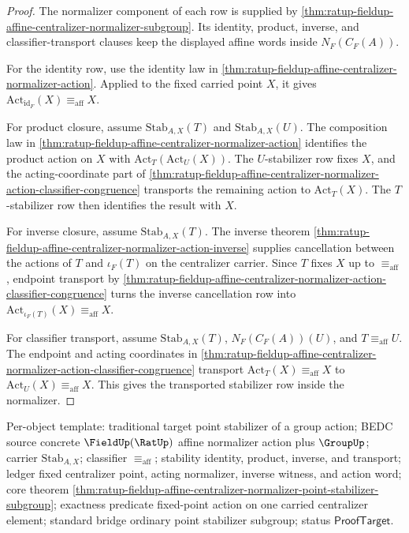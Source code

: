 \begin{proof}
The normalizer component of each row is supplied by
\autoref{thm:ratup-fieldup-affine-centralizer-normalizer-subgroup}. Its
identity, product, inverse, and classifier-transport clauses keep the displayed
affine words inside $N_F(C_F(A))$.

For the identity row, use the identity law in
\autoref{thm:ratup-fieldup-affine-centralizer-normalizer-action}. Applied to
the fixed carried point $X$, it gives
$\mathrm{Act}_{\mathrm{id}_F}(X)\equiv_{\mathrm{aff}}X$.

For product closure, assume $\mathrm{Stab}_{A,X}(T)$ and
$\mathrm{Stab}_{A,X}(U)$. The composition law in
\autoref{thm:ratup-fieldup-affine-centralizer-normalizer-action} identifies
the product action on $X$ with
$\mathrm{Act}_T(\mathrm{Act}_U(X))$. The $U$-stabilizer row fixes $X$, and the
acting-coordinate part of
\autoref{thm:ratup-fieldup-affine-centralizer-normalizer-action-classifier-congruence}
transports the remaining action to $\mathrm{Act}_T(X)$. The $T$-stabilizer row
then identifies the result with $X$.

For inverse closure, assume $\mathrm{Stab}_{A,X}(T)$. The inverse theorem
\autoref{thm:ratup-fieldup-affine-centralizer-normalizer-action-inverse}
supplies cancellation between the actions of $T$ and $\iota_F(T)$ on the
centralizer carrier. Since $T$ fixes $X$ up to $\equiv_{\mathrm{aff}}$, endpoint
transport by
\autoref{thm:ratup-fieldup-affine-centralizer-normalizer-action-classifier-congruence}
turns the inverse cancellation row into
$\mathrm{Act}_{\iota_F(T)}(X)\equiv_{\mathrm{aff}}X$.

For classifier transport, assume $\mathrm{Stab}_{A,X}(T)$,
$N_F(C_F(A))(U)$, and $T\equiv_{\mathrm{aff}}U$. The endpoint and acting
coordinates in
\autoref{thm:ratup-fieldup-affine-centralizer-normalizer-action-classifier-congruence}
transport $\mathrm{Act}_T(X)\equiv_{\mathrm{aff}}X$ to
$\mathrm{Act}_U(X)\equiv_{\mathrm{aff}}X$. This gives the transported
stabilizer row inside the normalizer.
\end{proof}

Per-object template: traditional target point stabilizer of a group action;
BEDC source concrete $\FieldUp(\RatUp)$ affine normalizer action plus
$\GroupUp$; carrier $\mathrm{Stab}_{A,X}$; classifier
$\equiv_{\mathrm{aff}}$; stability identity, product, inverse, and transport;
ledger fixed centralizer point, acting normalizer, inverse witness, and action
word; core theorem
\autoref{thm:ratup-fieldup-affine-centralizer-normalizer-point-stabilizer-subgroup};
exactness predicate fixed-point action on one carried centralizer element;
standard bridge ordinary point stabilizer subgroup; status
$\mathsf{ProofTarget}$.


